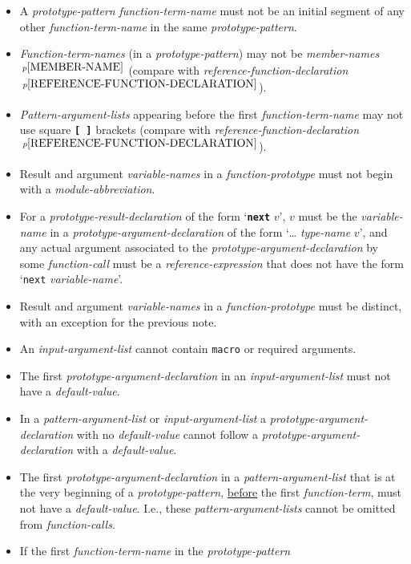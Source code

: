 \documentclass[12pt]{article}
\newcommand{\TT}[1]{{\tt \bfseries #1}}
\newcommand{\pagnote}[1]{$\,^{p\pageref{#1}}$}
\begin{document}
\begin{itemize}\label{FUNCTION-DECLARATION-RULES}
\item
A {\em prototype-pattern} {\em function-term-name} must not be
an initial segment of any other {\em function-term-name}
in the same {\em prototype-pattern}.
\item
{\em Function-term-names} (in a {\em prototype-pattern})
may not be {\em member-names}\pagnote{MEMBER-NAME}
(compare with {\em reference-function-declaration}%
\pagnote{REFERENCE-FUNCTION-DECLARATION}).
\item
{\em Pattern-argument-lists} appearing before the first
{\em function-term-name} may not use square \TT{[~]} brackets
(compare with {\em reference-function-declaration}%
\pagnote{REFERENCE-FUNCTION-DECLARATION}).
\item
Result and argument {\em variable-names}
in a {\em function-prototype} must not begin with a {\em module-abbreviation}.
\item
\label{PROTOTYPE-NEXT-RESULT}
For a {\em prototype-result-declaration} of the form `\TT{next} $v$',
$v$ must be the {\em vari\-able-name} in a {\em prototype-argument-declaration}
of the form `\dots{} {\em type-name} $v$', and
any actual argument associated to the {\em prototype-argument-declaration}
by some {\em function-call}
must be a {\em reference-expression} that
does not have the form `{\tt next} {\em variable-name}'.
\item
Result and argument {\em variable-names}
in a {\em function-prototype} must
be distinct, with an exception for the previous note.
\item
An {\em input-argument-list} cannot contain {\tt macro} or required
arguments.
\item
The first {\em prototype-argument-declaration} in an {\em input-argument-list}
must not have a {\em default-value}.
\item
In a {\em pattern-argument-list} or {\em input-argument-list}
a {\em prototype-argument-declaration} with no {\em de\-fault-value} cannot
follow a {\em prototype-argument-declaration} with a {\em default-value}.
\item
The first {\em prototype-argument-declaration}
in a {\em pattern-argument-list} that is at the very beginning
of a {\em prototype-pattern}, \underline{before} the first
{\em function-term}, must not have a {\em default-value}.
I.e., these {\em pattern-argument-lists} cannot be omitted from
{\em function-calls}.
\item
If the first {\em function-term-name} in the {\em prototype-pattern}

\end{itemize}
\end{document}
